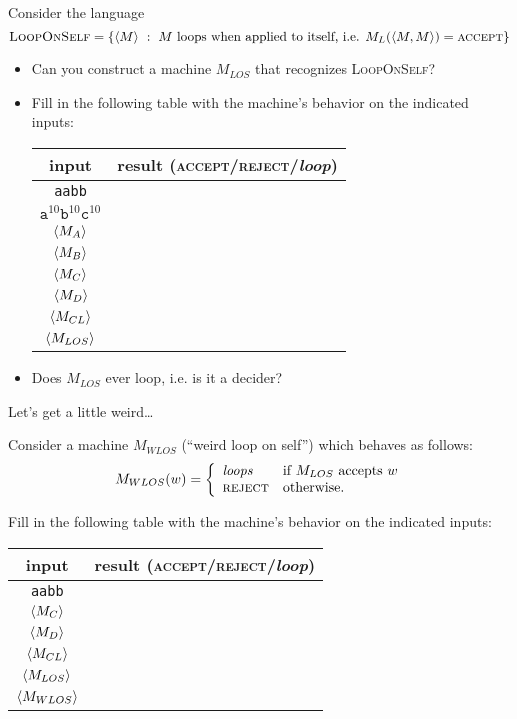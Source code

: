 \documentclass[twoside,letterpaper,openany]{book}
\begin{document}
\begin{exer}
Consider the language
\[ \textsc{LoopOnSelf} = \left\lbrace {\langle{M}\rangle}\ :\ M~\textrm{loops when applied to itself, i.e. $M_L({\langle{M, M}\rangle}) = \textsc{accept}$} \right\rbrace \]
\begin{itemize}
\item Can you construct a machine $M_{LOS}$ that recognizes \textsc{LoopOnSelf}? 
\item Fill in the following table with the machine's behavior on the indicated inputs:
\begin{center}
\renewcommand{\arraystretch}{1.25}
\begin{tabular}[c]{c|c}
input & result (\textsc{accept}/\textsc{reject}/\textit{loop}) \\\hline
\texttt{aabb} & \\
$\texttt{a}^{10}\texttt{b}^{10}\texttt{c}^{10}$ & \\
${\langle{M_{A}}\rangle}$ & \\
${\langle{M_{B}}\rangle}$ & \\
${\langle{M_{C}}\rangle}$ & \\
${\langle{M_{D}}\rangle}$ & \\
${\langle{M_{CL}}\rangle}$ & \\
${\langle{M_{LOS}}\rangle}$ & \\
\end{tabular}
\end{center}

\item Does $M_{LOS}$ ever loop, i.e. is it a decider?
\end{itemize}
\end{exer}

\begin{discussion}
Let's get a little weird\ldots
\end{discussion}

\begin{exer}
Consider a machine $M_{WLOS}$ (``weird loop on self'') which behaves as follows:
\[ M_{WLOS}(w) = \bigg\{
\begin{array}{ll}
\textit{loops} &  \textrm{if $M_{LOS}$ accepts $w$} \\
\textsc{reject} & \textrm{otherwise.}
\end{array}
\]

Fill in the following table with the machine's behavior on the indicated inputs:
\begin{center}
\renewcommand{\arraystretch}{1.25}
\begin{tabular}[c]{c|c}
input & result (\textsc{accept}/\textsc{reject}/\textit{loop}) \\\hline
\texttt{aabb} & \\
${\langle{M_{C}}\rangle}$ & \\
${\langle{M_{D}}\rangle}$ & \\
${\langle{M_{CL}}\rangle}$ & \\
${\langle{M_{LOS}}\rangle}$ & \\
${\langle{M_{WLOS}}\rangle}$ & \\
\end{tabular}
\end{center}

\end{exer}
\end{document}
